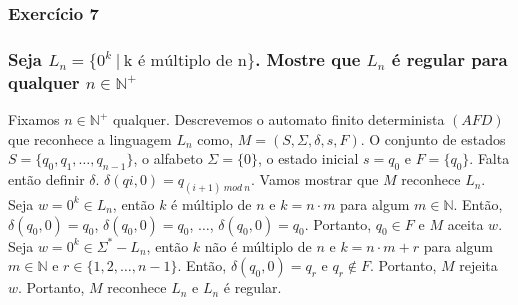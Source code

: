 \subsubsection{Exercício 7}

\subsubsection*{Seja $L_n = \{0^k \ | \ \textrm{k é múltiplo de n} \}$. Mostre que $L_n$ é regular para qualquer $n \in \mathbb{N}^+$}

\begin{spacing}{1.5}

Fixamos $n \in \mathbb{N}^+$ qualquer. Descrevemos o automato finito determinista $(AFD)$ que reconhece a linguagem $L_n$ como, $M = (S, \Sigma, \delta, s, F)$. O conjunto de estados $S =  \{q_0, q_1, \hdots, q_{n-1}\}$, o alfabeto $\Sigma = \{0\}$, o estado inicial $s = q_0$ e $F=\{q_0\}$. Falta então definir $\delta$. $\delta(qi,0) = q_{(i+1) \ mod \ n}$. Vamos mostrar que $M$ reconhece $L_n$. Seja $w = 0^k \in L_n$, então $k$ é múltiplo de $n$ e $k = n \cdot m$ para algum $m \in \mathbb{N}$. Então, $\delta(q_0, 0) = q_0$, $\delta(q_0, 0) = q_0$, $\hdots$, $\delta(q_0, 0) = q_0$. Portanto, $q_0 \in F$ e $M$ aceita $w$. Seja $w = 0^k \in \Sigma^{*} - L_n$, então $k$ não é múltiplo de $n$ e $k = n \cdot m + r$ para algum $m \in \mathbb{N}$ e $r \in \{1, 2, \hdots, n-1\}$. Então, $\delta(q_0, 0) = q_r$ e $q_r \notin F$. Portanto, $M$ rejeita $w$. Portanto, $M$ reconhece $L_n$ e $L_n$ é regular.
\end{spacing}
